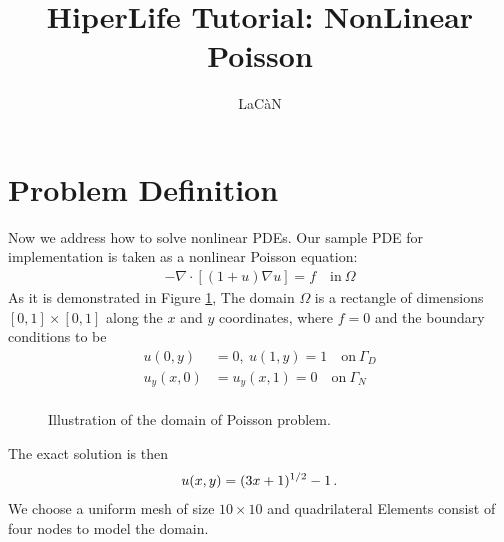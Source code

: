 \documentclass[]{article}
\begin{document}
\title{HiperLife Tutorial: NonLinear Poisson}
\author{LaCàN}
\maketitle

\linenumbers

\section{Problem Definition} \label{sec: pd} 
Now we address how to solve nonlinear PDEs. Our sample PDE for implementation is taken as a nonlinear Poisson equation:\cite{BarattaEtal2023}
\begin{equation}\label{eq1}
	\begin{aligned}
		 - \nabla \cdot [(1+u)\nabla u] = f \quad \text{in} \ \Omega
	\end{aligned}
\end{equation}
As it is demonstrated in Figure \ref{fig_SB}, The domain $\Omega$ is a rectangle of dimensions $[0,1] \times [0,1]$ along the $x$ and $y$ coordinates, where $f = 0$ and the boundary conditions to be
\begin{equation}\label{eq2}
	\begin{aligned}
		u(0,y) &= 0, \ u(1,y) = 1\quad \text{on} \ \Gamma_D \\
		u_y(x,0) &=u_y(x,1) =0 \quad \text{on} \ \Gamma_N \\
	\end{aligned}
\end{equation}
\begin{figure}[htbp]
	\centering
	
	\caption{Illustration of the domain of Poisson problem.}
	\label{fig_SB}
\end{figure}

The exact solution is then
\begin{equation}\label{eq3}
	\begin{aligned}
		u(x,y) = (3x +1)^{1/2}-1\thinspace .
	\end{aligned}
\end{equation}
We choose a uniform mesh of size $10 \times 10$ and quadrilateral Elements consist of four nodes to model the domain.
\end{document}
